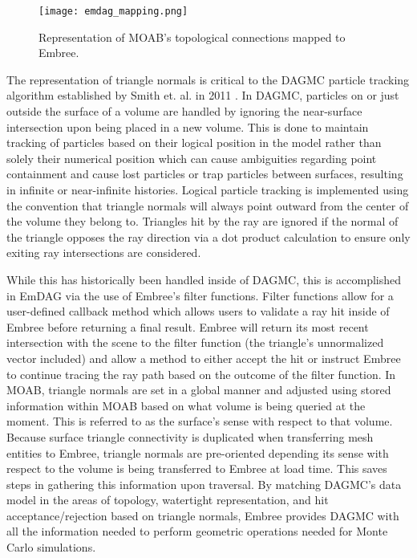 \begin{figure}
  \centering
  \texttt{[image: emdag\_mapping.png]}
  \caption[Topology of MOAB to Embree mapping.]{Representation of MOAB's
    topological connections mapped to Embree.}
  \label{fig:emdag_mapping}
\end{figure}

The representation of triangle normals is critical to the DAGMC particle
tracking algorithm established by Smith et. al. in 2011 \cite{Smith_2011}. In
DAGMC, particles on or just outside the surface of a volume are handled by
ignoring the near-surface intersection upon being placed in a new volume. This
is done to maintain tracking of particles based on their logical position in the
model rather than solely their numerical position which can cause ambiguities
regarding point containment and cause lost particles or trap particles between
surfaces, resulting in infinite or near-infinite histories. Logical particle
tracking is implemented using the convention that triangle normals will always
point outward from the center of the volume they belong to. Triangles hit by the
ray are ignored if the normal of the triangle opposes the ray direction via a
dot product calculation to ensure only exiting ray intersections are
considered.

While this has historically been handled inside of DAGMC, this is accomplished
in EmDAG via the use of Embree's filter functions. Filter functions allow for a
user-defined callback method which allows users to validate a ray hit inside of
Embree before returning a final result. Embree will return its most recent
intersection with the scene to the filter function (the triangle's unnormalized
vector included) and allow a method to either accept the hit or instruct Embree
to continue tracing the ray path based on the outcome of the filter function. In
MOAB, triangle normals are set in a global manner and adjusted using stored
information within MOAB based on what volume is being queried at the
moment. This is referred to as the surface's sense with respect to that
volume. Because surface triangle connectivity is duplicated when transferring
mesh entities to Embree, triangle normals are pre-oriented depending its sense
with respect to the volume is being transferred to Embree at load time. This
saves steps in gathering this information upon traversal. By matching DAGMC's
data model in the areas of topology, watertight representation, and hit
acceptance/rejection based on triangle normals, Embree provides DAGMC with all
the information needed to perform geometric operations needed for Monte Carlo
simulations.

